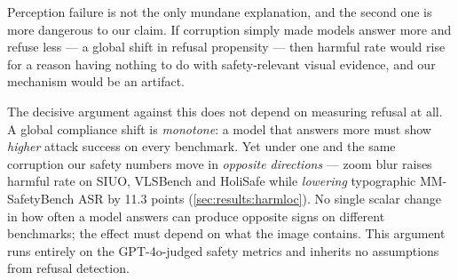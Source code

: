 \begin{table}[t]
  \centering
  \caption{\textbf{The benign control, split by where the request lives.} Change in over-refusal rate (\%) on \emph{benign} prompts under blur, averaged over severities 1--5, beside the harmful-rate change on natural images. The two benign suites must not be pooled: XSTest's benign request is \emph{typeset into the image}, so blur attacks its legibility, whereas MMSafeAware's over-safety subset~\cite{wang2025mmsafeaware} uses natural images and therefore isolates a genuine change in compliance. For the safety-tuned model the dissociation is clean --- benign natural-image over-refusal is flat while harmful compliance rises. $^\dagger$noise only (no blur sweep available).}
  \label{tab:benign-control}
  \small
  \setlength{\tabcolsep}{4pt}
\end{table}

Perception failure is not the only mundane explanation, and the second one is more dangerous to our claim. If corruption simply made models answer more and refuse less --- a global shift in refusal propensity --- then harmful rate would rise for a reason having nothing to do with safety-relevant visual evidence, and our mechanism would be an artifact.

The decisive argument against this does not depend on measuring refusal at all. A global compliance shift is \emph{monotone}: a model that answers more must show \emph{higher} attack success on every benchmark. Yet under one and the same corruption our safety numbers move in \emph{opposite directions} --- zoom blur raises harmful rate on SIUO, VLSBench and HoliSafe while \emph{lowering} typographic MM-SafetyBench ASR by 11.3 points (\cref{sec:results:harmloc}). No single scalar change in how often a model answers can produce opposite signs on different benchmarks; the effect must depend on what the image contains. This argument runs entirely on the GPT-4o-judged safety metrics and inherits no assumptions from refusal detection.


